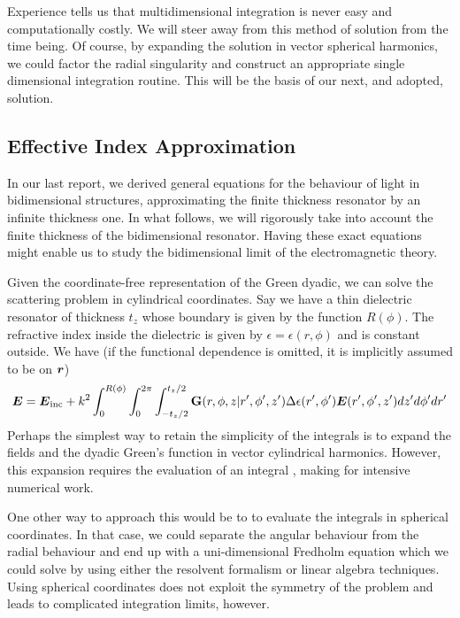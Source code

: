 Experience tells us that multidimensional integration is never easy and 
computationally costly. We will steer away from this method of solution
from the time being. Of course, by expanding the solution in 
vector spherical harmonics, we could factor the radial singularity
and construct an appropriate single dimensional integration routine. 
This will be the basis of our next, and adopted, solution.

\subsection{Effective Index Approximation}
In our last report, we derived general equations for the
behaviour of light in bidimensional structures, approximating 
the finite thickness resonator by an infinite thickness one. In 
what follows, we will rigorously take into account the finite thickness
of the bidimensional resonator. Having these exact equations might enable us
to study the bidimensional limit of the electromagnetic theory. 

Given the coordinate-free representation of the Green dyadic, we can solve
the scattering problem in cylindrical coordinates. Say  we have
a thin dielectric resonator of thickness $t_z$ whose boundary is given
by the function $R(\phi)$. The refractive
index inside the dielectric is given by $\epsilon=\epsilon(r,\phi)$ and
is constant outside. We have (if the functional dependence is omitted, it is implicitly
assumed to be on $\boldsymbol{r}$)
  \begin{equation}
   \boldsymbol{E} = \boldsymbol{E}_\text{inc}
	  +k^2\int_{0}^{R(\phi)}\int_0^{2\pi}\int_{-t_z/2}^{t_z/2}\mathbf{G}(r,\phi,z|r',\phi',z')\Delta\epsilon(r',\phi')\boldsymbol{E}(r',\phi',z')dz'd\phi'dr'
  \end{equation}
Perhaps the simplest way to retain the simplicity of the integrals is to expand the fields and the dyadic Green's function
in vector cylindrical harmonics. However, this expansion requires the evaluation of an integral \cite{BEN1968}, making 
for intensive numerical work. 

One other way to approach this would be to to evaluate the integrals in spherical coordinates. In that 
case, we could separate the angular behaviour from the radial behaviour and end up with 
a uni-dimensional Fredholm equation which we could solve by using either the resolvent formalism
or linear algebra techniques. Using spherical coordinates does not exploit the symmetry of the problem
and leads to complicated integration limits, however.